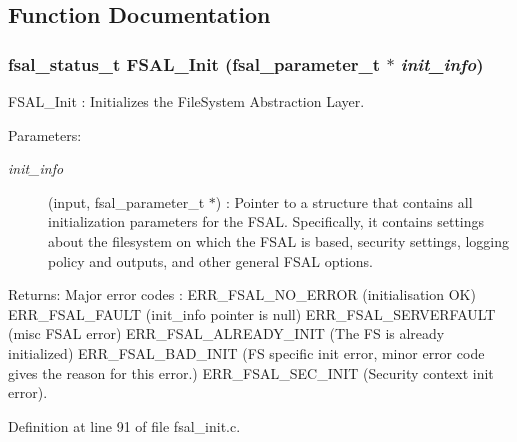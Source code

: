 \subsection{Function Documentation}
\subsubsection{\setlength{\rightskip}{0pt plus 5cm}fsal\_\-status\_\-t FSAL\_\-Init (fsal\_\-parameter\_\-t $\ast$ {\em init\_\-info})}\label{fsal__init_8c_a3}


FSAL\_\-Init : Initializes the File\-System Abstraction Layer.

\begin{Desc}
\item[Parameters:]
\begin{description}
\item[{\em init\_\-info}](input, fsal\_\-parameter\_\-t $\ast$) : Pointer to a structure that contains all initialization parameters for the FSAL. Specifically, it contains settings about the filesystem on which the FSAL is based, security settings, logging policy and outputs, and other general FSAL options.\end{description}
\end{Desc}
\begin{Desc}
\item[Returns:]Major error codes : ERR\_\-FSAL\_\-NO\_\-ERROR (initialisation OK) ERR\_\-FSAL\_\-FAULT (init\_\-info pointer is null) ERR\_\-FSAL\_\-SERVERFAULT (misc FSAL error) ERR\_\-FSAL\_\-ALREADY\_\-INIT (The FS is already initialized) ERR\_\-FSAL\_\-BAD\_\-INIT (FS specific init error, minor error code gives the reason for this error.) ERR\_\-FSAL\_\-SEC\_\-INIT (Security context init error). \end{Desc}


Definition at line 91 of file fsal\_\-init.c.